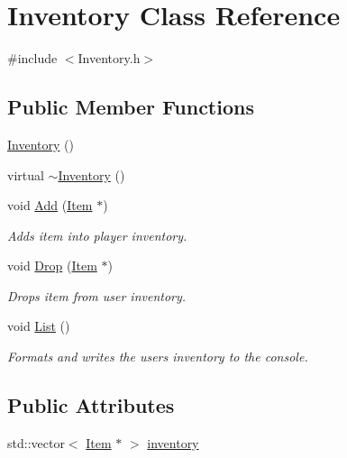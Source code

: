 \hypertarget{class_inventory}{}\section{Inventory Class Reference}
\label{class_inventory}


{\ttfamily \#include $<$Inventory.\+h$>$}

\subsection*{Public Member Functions}
\begin{DoxyCompactItemize}
\item 
\mbox{\hyperlink{class_inventory_a10485613fc8bfb32ee564d9b5110f8fb}{Inventory}} ()
\item 
virtual \mbox{\hyperlink{class_inventory_a6c6dfcb6d977c74a7abf46809e892e3d}{$\sim$\+Inventory}} ()
\item 
void \mbox{\hyperlink{class_inventory_a095bdcb71efeae197032fc6aacd37ed9}{Add}} (\mbox{\hyperlink{class_item}{Item}} $\ast$)
\begin{DoxyCompactList}\small\item\em Adds item into player inventory. \end{DoxyCompactList}\item 
void \mbox{\hyperlink{class_inventory_a9599fe69c229390adc504255a8941f33}{Drop}} (\mbox{\hyperlink{class_item}{Item}} $\ast$)
\begin{DoxyCompactList}\small\item\em Drops item from user inventory. \end{DoxyCompactList}\item 
void \mbox{\hyperlink{class_inventory_a3fbedd6b6eae5ee18dcb1283cda8728a}{List}} ()
\begin{DoxyCompactList}\small\item\em Formats and writes the users inventory to the console. \end{DoxyCompactList}\end{DoxyCompactItemize}
\subsection*{Public Attributes}
\begin{DoxyCompactItemize}
\item 
std\+::vector$<$ \mbox{\hyperlink{class_item}{Item}} $\ast$ $>$ \mbox{\hyperlink{class_inventory_a34fed530d676159a14178b36ce9981ca}{inventory}}
\end{DoxyCompactItemize}


